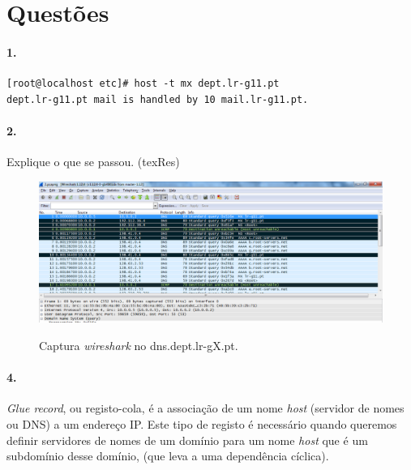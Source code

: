 \section*{Questões}
\paragraph{1.}

\begin{verbatim}
[root@localhost etc]# host -t mx dept.lr-g11.pt
dept.lr-g11.pt mail is handled by 10 mail.lr-g11.pt.
\end{verbatim}


\paragraph{2.}
Explique o que se passou. (texRes)

\begin{figure}[h]
\centering
\includegraphics[width=1\textwidth, height=0.33\textheight]{2_cap.png}
\label{fig:2-capturaWireshark}
\caption{Captura \emph{wireshark} no \textsf{dns.dept.lr-gX.pt}.}
\end{figure}











\paragraph{4.}
\emph{Glue record}, ou registo-cola, é a associação de um nome \emph{host} (servidor de nomes ou DNS) a um endereço IP.
Este tipo de registo é necessário quando queremos definir servidores de nomes de um domínio para um nome \emph{host} que é um subdomínio desse domínio, (que leva a uma dependência cíclica).

